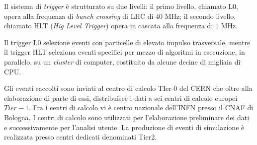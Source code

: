 Il sistema di \emph{trigger} \`e strutturato su due livelli: il primo livello, chiamato L0, opera alla frequenza di \emph{bunch crossing} di LHC di $40$ MHz;
  il secondo livello, chiamato HLT (\emph{Hig Level Trigger}) opera in cascata alla frequenza di $1$ MHz.

Il trigger L0 selezione eventi con particelle di elevato impulso trasversale, mentre il trigger HLT  seleziona  eventi specifici per mezzo di algoritmi in esecuzione, in parallelo, su un \emph{cluster} di computer, costituito da alcune decine di migliaia di CPU.

Gli eventi raccolti sono inviati al centro di calcolo TIer-0 del CERN che oltre alla elaborazione di parte di essi, distribuisce i dati a sei centri di calcolo europei $Tier-1$. Fra 
i centri di calcolo vi \`e centro nazionale dell'INFN presso il CNAF di Bologna. I centri di calcolo sono utilizzati per l'elaborazione preliminare dei dati e successivamente per l'analisi utente. La produzione di eventi di simulazione \`e realizzata presso centri dedicati denominati Tier2.
